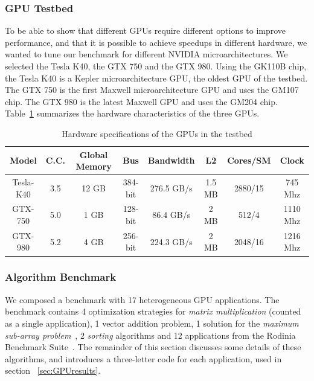 \subsubsection{GPU Testbed}

To be able to show that different GPUs require different options to improve
performance, and that it is possible to achieve speedups in different hardware,
we wanted to tune our benchmark for different NVIDIA microarchitectures.  We
selected the Tesla K40, the GTX 750 and the GTX 980.  Using the GK110B chip,
the Tesla K40 is a Kepler microarchitecture GPU, the oldest GPU of the testbed.
The GTX 750 is the first Maxwell microarchitecture GPU and uses the GM107 chip.
The GTX 980 is the latest Maxwell GPU and uses the GM204 chip.
Table~\ref{tab:GPUs} summarizes the hardware characteristics of the three GPUs.

\begin{table}[thpb]
    \centering
    \footnotesize
    \begin{tabular}{cccccccc}
        \toprule
        \textbf{Model}&\textbf{C.C.}&\textbf{Global Memory}&\textbf{Bus}&\textbf{Bandwidth}&\textbf{L2}&\textbf{Cores/SM}&\textbf{Clock} \\ \midrule
        Tesla-K40&3.5&12 GB&384-bit&276.5 GB/s&1.5 MB&2880/15&745 Mhz \\ \midrule
        GTX-750&5.0&1 GB&128-bit&86.4 GB/s&2 MB&512/4&1110 Mhz \\ \midrule
        GTX-980&5.2&4 GB&256-bit&224.3 GB/s&2 MB&2048/16&1216 Mhz \\ \bottomrule
    \end{tabular}
    \caption{Hardware specifications of the GPUs in the testbed}
    \label{tab:GPUs}
\end{table}

\subsubsection{Algorithm Benchmark}

We composed a benchmark with 17 heterogeneous GPU applications.  The benchmark
contains 4 optimization strategies for \emph{matrix multiplication} (counted as
a single application), 1 vector addition problem, 1 solution for the
\emph{maximum sub-array problem}~\cite{ferreira2014parallel}, 2 \emph{sorting}
algorithms and 12 applications from the Rodinia Benchmark
Suite~\cite{che2009rodinia}.  The remainder of this section discusses some
details of these algorithms, and introduces a three-letter code for each
application, used in section ~\ref{sec:GPUresults}.

